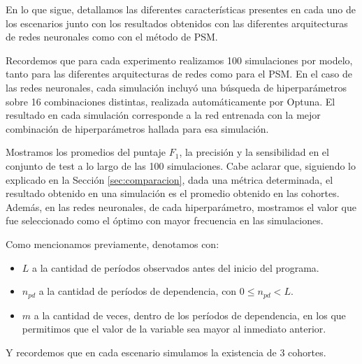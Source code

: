 \documentclass[../../main.tex]{subfiles}
\begin{document}
En lo que sigue, detallamos las diferentes características presentes en cada uno de
los escenarios junto con los resultados obtenidos con las diferentes arquitecturas
de redes neuronales como con el método de PSM.

Recordemos que para cada experimento realizamos 100 simulaciones por modelo, tanto para
las diferentes arquitecturas de redes como para el PSM. En el caso de las redes
neuronales, cada simulación incluyó una búsqueda de hiperparámetros sobre 16 combinaciones
distintas, realizada automáticamente por Optuna. El resultado en cada simulación
corresponde a la red entrenada con la mejor combinación de hiperparámetros hallada para
esa simulación.

Mostramos los promedios del puntaje \(F_1\), la precisión y la sensibilidad en el conjunto
de test a lo largo de las 100 simulaciones. Cabe aclarar que, siguiendo lo explicado en la
Sección \ref{sec:comparacion}, dada una métrica determinada, el resultado obtenido en una
simulación es el promedio obtenido en las cohortes. Además, en las redes neuronales, de
cada hiperparámetro, mostramos el valor que fue seleccionado como el óptimo con mayor
frecuencia en las simulaciones.

Como mencionamos previamente, denotamos con:
\begin{itemize}
    \item \(L\) a la cantidad de períodos observados antes del inicio del programa.
    \item \(n_{pd}\) a la cantidad de períodos de dependencia, con \(0 \le n_{pd} < L\).
    \item \(m\) a la cantidad de veces, dentro de los períodos de dependencia, en los que
    permitimos que el valor de la variable sea mayor al inmediato anterior.
\end{itemize}
Y recordemos que en cada escenario simulamos la existencia de 3 cohortes.
\end{document}
